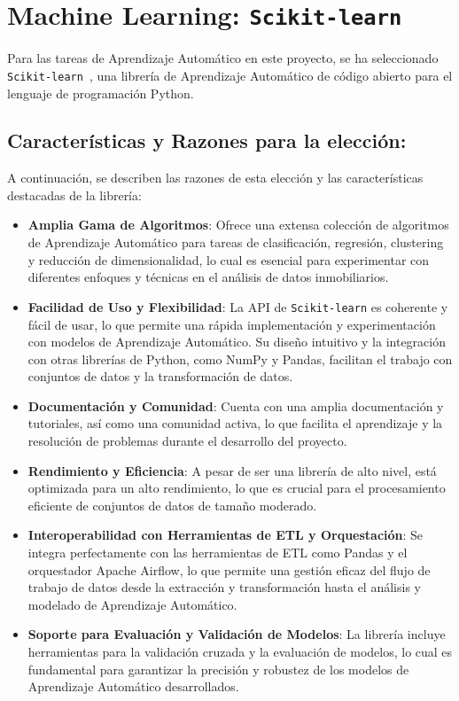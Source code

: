 \section{Machine Learning: \texttt{Scikit-learn}}\label{sec:ml_section}

Para las tareas de Aprendizaje Automático en este proyecto, se ha seleccionado \texttt{Scikit-learn}~\cite{scikit-learn}, una librería de Aprendizaje Automático de código abierto para el lenguaje de programación Python. 

\subsection{Características y Razones para la elección:  }

A continuación, se describen las razones de esta elección y las características destacadas de la librería:

\begin{itemize}
    \item \textbf{Amplia Gama de Algoritmos}: Ofrece una extensa colección de algoritmos de Aprendizaje Automático para tareas de clasificación, regresión, clustering y reducción de dimensionalidad, lo cual es esencial para experimentar con diferentes enfoques y técnicas en el análisis de datos inmobiliarios.

    \item \textbf{Facilidad de Uso y Flexibilidad}: La API de \texttt{Scikit-learn} es coherente y fácil de usar, lo que permite una rápida implementación y experimentación con modelos de Aprendizaje Automático. Su diseño intuitivo y la integración con otras librerías de Python, como NumPy y Pandas, facilitan el trabajo con conjuntos de datos y la transformación de datos.

    \item \textbf{Documentación y Comunidad}: Cuenta con una amplia documentación y tutoriales, así como una comunidad activa, lo que facilita el aprendizaje y la resolución de problemas durante el desarrollo del proyecto.

    \item \textbf{Rendimiento y Eficiencia}: A pesar de ser una librería de alto nivel, está optimizada para un alto rendimiento, lo que es crucial para el procesamiento eficiente de conjuntos de datos de tamaño moderado.

    \item \textbf{Interoperabilidad con Herramientas de ETL y Orquestación}: Se integra perfectamente con las herramientas de ETL como Pandas y el orquestador Apache Airflow, lo que permite una gestión eficaz del flujo de trabajo de datos desde la extracción y transformación hasta el análisis y modelado de Aprendizaje Automático.

    \item \textbf{Soporte para Evaluación y Validación de Modelos}: La librería incluye herramientas para la validación cruzada y la evaluación de modelos, lo cual es fundamental para garantizar la precisión y robustez de los modelos de Aprendizaje Automático desarrollados.
\end{itemize}

